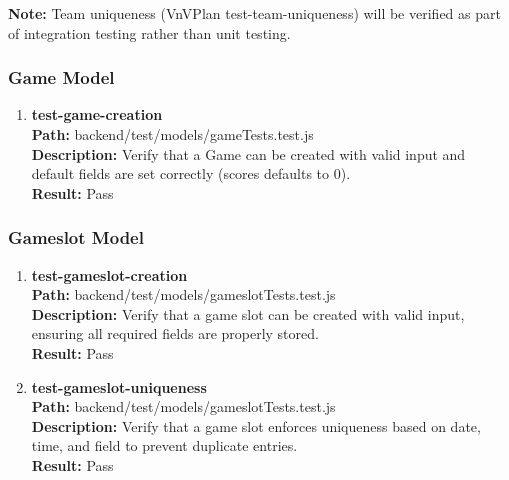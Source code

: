 \documentclass[12pt, titlepage]{article}
\begin{document}
\textbf{Note:} Team uniqueness (VnVPlan test-team-uniqueness) will be verified as part of integration testing rather than unit testing.
\subsubsection{Game Model}
\begin{enumerate}
    \item{\textbf{test-game-creation}\\}
        \textbf{Path:} backend/test/models/gameTests.test.js\\
        \textbf{Description:} Verify that a Game can be created with valid input and default fields are set correctly (scores defaults to 0).\\
        \textbf{Result:} Pass
\end{enumerate}

\subsubsection{Gameslot Model}
\begin{enumerate}
    \item{\textbf{test-gameslot-creation}\\}
        \textbf{Path:} backend/test/models/gameslotTests.test.js\\
        \textbf{Description:} Verify that a game slot can be created with valid input, ensuring all required fields are properly stored.\\
        \textbf{Result:} Pass

    \item{\textbf{test-gameslot-uniqueness}\\}
        \textbf{Path:} backend/test/models/gameslotTests.test.js\\
        \textbf{Description:} Verify that a game slot enforces uniqueness based on date, time, and field to prevent duplicate entries.\\
        \textbf{Result:} Pass
\end{enumerate}
\end{document}
